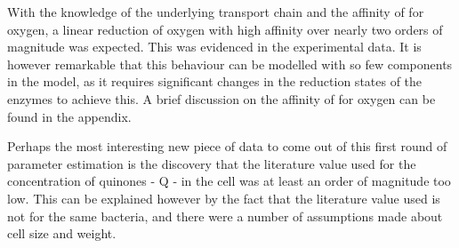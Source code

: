 With the knowledge of the underlying transport chain and the affinity of \cbbthree{} for oxygen, a linear reduction of oxygen with high affinity over nearly two orders of magnitude was expected. This was evidenced in the experimental data. It is however remarkable that this behaviour can be modelled with so few components in the model, as it requires significant changes in the reduction states of the enzymes to achieve this. A brief discussion on the affinity of \cbbthree{} for oxygen can be found in the appendix.

Perhaps the most interesting new piece of data to come out of this first round of parameter estimation is the discovery that the literature value used for the concentration of quinones - Q - in the cell was at least an order of magnitude too low. This can be explained however by the fact that the literature value used is not for the same bacteria, and there were a number of assumptions made about \Nsm{} cell size and weight.
